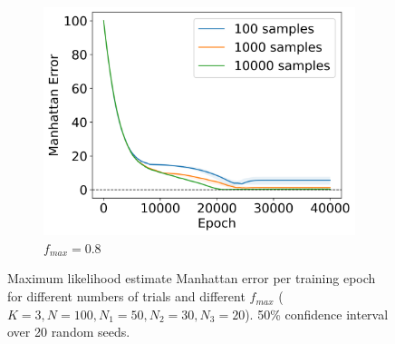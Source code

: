 \documentclass{article}
\theoremstyle{plain}
\theoremstyle{definition}
\theoremstyle{remark}
\begin{document}
\begin{figure}[h]
\begin{subfigure}[b]{0.32\textwidth}
         \centering
         \includegraphics[width=\textwidth]{sgd_k3_50ci_80frac.png}
         \caption{$f_{max}=0.8$}
         \label{fig:appendix_sgd_k=3_0.8frac}
     \end{subfigure}
     \caption{Maximum likelihood estimate Manhattan error per training epoch for different numbers of trials and different $f_{max}$ ($K=3, N=100, N_1=50, N_2=30, N_3=20$). 50\% confidence interval over 20 random seeds.}
     \label{fig:appendix_sgd2}
\end{figure}
\end{document}
